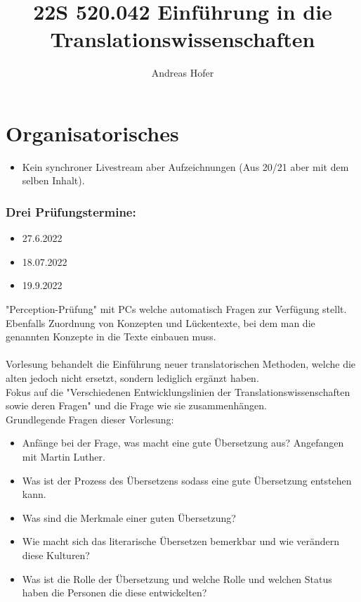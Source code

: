 \documentclass{article}
\title{22S 520.042 Einführung in die Translationswissenschaften}
\author{Andreas Hofer}
\begin{document}
	\section*{Organisatorisches}
	\begin{itemize}
		\item{Kein synchroner Livestream aber Aufzeichnungen  (Aus 20/21 aber mit dem selben Inhalt).}
	\end{itemize}
	\subsubsection*{Drei Prüfungstermine:}
	\begin{itemize}
		\item{27.6.2022}
		\item{18.07.2022}
		\item{19.9.2022}
	\end{itemize}
	"Perception-Prüfung" mit PCs welche automatisch Fragen zur Verfügung stellt. Ebenfalls Zuordnung von Konzepten und Lückentexte, bei dem man die genannten Konzepte in die Texte einbauen muss. \\ \\
	Vorlesung behandelt die Einführung neuer translatorischen Methoden, welche die alten jedoch nicht ersetzt, sondern lediglich ergänzt haben. \\
	Fokus auf die "Verschiedenen Entwicklungslinien der Translationswissenschaften sowie deren Fragen" und die Frage wie sie zusammenhängen. \\
	Grundlegende Fragen dieser Vorlesung:
	\begin{itemize}
		\item{Anfänge bei der Frage, was macht eine gute Übersetzung aus? Angefangen mit Martin Luther.}
		\item{Was ist der Prozess des Übersetzens sodass eine gute Übersetzung entstehen kann.}
		\item{Was sind die Merkmale einer guten Übersetzung?}
		\item{Wie macht sich das literarische Übersetzen bemerkbar und wie verändern diese Kulturen?}
		\item{Was ist die Rolle der Übersetzung und welche Rolle und welchen Status haben die Personen die diese entwickelten?}
	\end{itemize}

	\newpage
\end{document}
